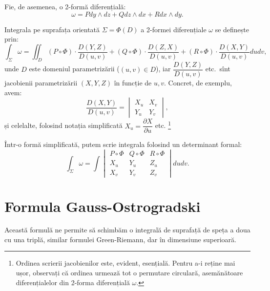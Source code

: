 Fie, de asemenea, o 2-formă diferențială\footnotemark:
\[
  \omega = P dy\wedge dz + Q dz \wedge dx + R dx \wedge dy.
\]


Integrala pe suprafața orientată $ \Sigma = \Phi(D) $ a 2-formei diferențiale
$ \omega $ se definește prin:
\[
  \int_\Sigma \omega = \iint_D (P \circ \Phi) \cdot \frac{D(Y,Z)}{D(u, v)} + %
  (Q \circ \Phi) \cdot \frac{D(Z, X)}{D(u, v)} + %
  (R \circ \Phi) \cdot \frac{D(X, Y)}{D(u, v)} dudv,
\]
unde $ D $ este domeniul parametrizării ($(u, v) \in D$),
iar $ \dfrac{D(Y, Z)}{D(u, v)} $ etc.\ sînt jacobienii parametrizării
$ (X, Y, Z) $ în funcție de $ u, v $. Concret, de exemplu, avem:
\[
  \frac{D(X, Y)}{D(u, v)} = %
  \begin{vmatrix}
    X_u & X_v \\
    Y_u & Y_v
  \end{vmatrix},
\]
și celelalte, folosind notația simplificată $ X_u = \dfrac{\partial X}{\partial u} $ etc.
\footnote{Ordinea scrierii jacobienilor este, evident, esențială. Pentru
  a-i reține mai ușor, observați că ordinea urmează tot o permutare circulară,
  asemănătoare diferențialelor din 2-forma diferențială $ \omega $.}

Într-o formă simplificată, putem scrie integrala folosind un determinant formal:
\[
  \int_\Sigma \omega = \int %
  \begin{vmatrix}
    P \circ \Phi & Q \circ \Phi & R \circ \Phi \\
    X_u & Y_u & Z_u \\
    X_v & Y_v & Z_v
  \end{vmatrix} dudv.
\]


\section{Formula Gauss-Ostrogradski}
Această formulă ne permite să schimbăm o integrală de suprafață de speța
a doua cu una triplă, similar formulei Green-Riemann, dar în dimensiune
superioară.

